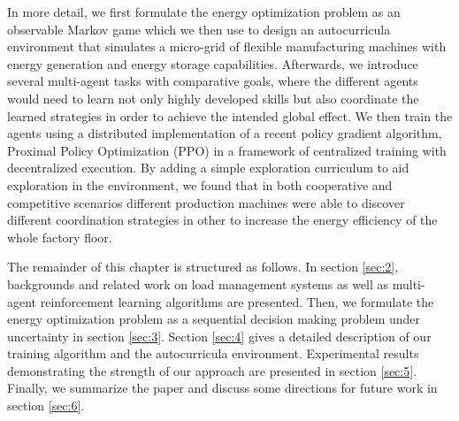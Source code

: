 In more detail, we first formulate the energy optimization problem as an observable Markov game which we then use to design an autocurricula environment that simulates a micro-grid of flexible manufacturing machines with energy generation and energy storage capabilities. Afterwards, we introduce several multi-agent tasks with comparative goals, where the different agents would need to learn not only highly developed skills but also coordinate the learned strategies in order to achieve the intended global effect. We then train the agents using a distributed implementation of a recent policy gradient algorithm, Proximal Policy Optimization (PPO) \cite{schulman2017proximal} in a framework of centralized training with decentralized execution. By adding a simple exploration curriculum to aid exploration in the environment, we found that in both cooperative and competitive scenarios different production machines were able to discover different coordination strategies in other to increase the energy efficiency of the whole factory floor.

The remainder of this chapter is structured as follows. In section \ref{sec:2}, backgrounds and related work on load management systems as well as multi-agent reinforcement learning algorithms are presented. Then, we formulate the energy optimization problem as a sequential decision making problem under uncertainty in section \ref{sec:3}. Section \ref{sec:4} gives a detailed description of our training algorithm and the autocurricula environment. Experimental results demonstrating the strength of our approach are presented in section \ref{sec:5}. Finally, we summarize the paper and discuss some directions for future work in section \ref{sec:6}.
